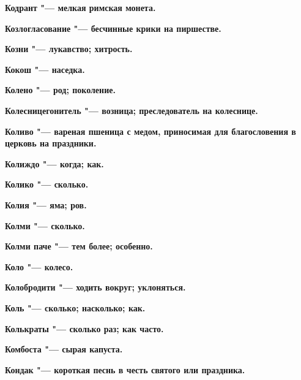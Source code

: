 \begin{multicols}{2}
\bfseries Кодрант\normalfont{} "--- мелкая римская монета. 




\bfseries Козлогласование\normalfont{} "--- бесчинные крики на пиршестве. 




\bfseries Козни\normalfont{} "--- лукавство; хитрость. 




\bfseries Кокош\normalfont{} "--- наседка. 




\bfseries Колено\normalfont{} "--- род; поколение. 




\bfseries Колесницегонитель\normalfont{} "--- возница; преследователь на колеснице. 




\bfseries Коливо\normalfont{} "--- вареная пшеница с медом, приносимая для благословения в церковь на праздники. 




\bfseries Колиждо\normalfont{} "--- когда; как. 




\bfseries Колико\normalfont{} "--- сколько. 




\bfseries Колия\normalfont{} "--- яма; ров. 




\bfseries Колми\normalfont{} "--- сколько. 




\bfseries Колми паче\normalfont{} "--- тем более; особенно. 




\bfseries Коло\normalfont{} "--- колесо. 




\bfseries Колобродити\normalfont{} "--- ходить вокруг; уклоняться. 




\bfseries Коль\normalfont{} "--- сколько; насколько; как. 




\bfseries Колькраты\normalfont{} "--- сколько раз; как часто. 




\bfseries Комбоста\normalfont{} "--- сырая капуста. 




\bfseries Кондак\normalfont{} "--- короткая песнь в честь святого или праздника. 





\end{multicols}
